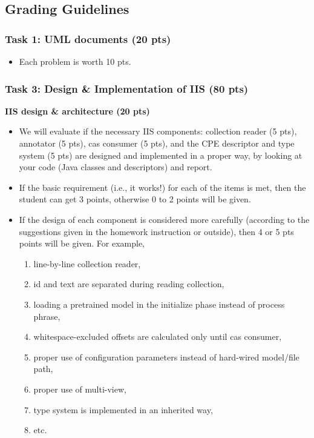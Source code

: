 
\newpage

\subsection{Grading Guidelines}

\subsubsection{Task 1: UML documents (20 pts)}

\begin{itemize}

\item Each problem is worth 10 pts. \\
 
\end{itemize}

\subsubsection{Task 3: Design \& Implementation of IIS (80 pts)}

\textbf{IIS design \& architecture (20 pts)}
 
\begin{itemize}

\item We will evaluate if the necessary IIS components: collection reader (5
pts), annotator (5 pts), cas consumer (5 pts), and the CPE descriptor and type
system (5 pts) are designed and implemented in a proper way, by looking at your
code (Java classes and descriptors) and report.

\item If the basic requirement (i.e., it works!) for each of the items is met,
then the student can get 3 points, otherwise 0 to 2 points will be given.

\item If the design of each component is considered more carefully (according to
the suggestions given in the homework instruction or outside), then 4 or 5 pts
points will be given. For example,

\begin{enumerate}
\item line-by-line collection reader,
\item id and text are separated during reading collection,
\item loading a pretrained model in the initialize phase instead of process phrase,
\item whitespace-excluded offsets are calculated only until cas consumer,
\item proper use of configuration parameters instead of hard-wired model/file path,
\item proper use of multi-view,
\item type system is implemented in an inherited way,
\item etc.
\end{enumerate}

\end{itemize}

